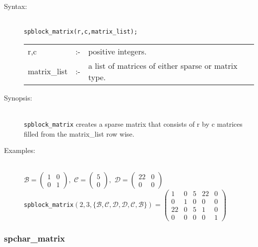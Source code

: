 \begin{description}

\item[Syntax:]\mbox{}\\
\texttt{spblock\_matrix(r,c,matrix\_list);}\\[2mm]
\begin{tabular}{l l l}
r,c          &:-& positive integers. \\
matrix\_list &:-& a list of matrices of either sparse or matrix type.
\end{tabular}

\item[Synopsis:]\mbox{}\\
\texttt{spblock\_matrix} creates a sparse matrix that consists of r by c matrices
filled from the matrix\_list row wise.

\item[Examples:]\mbox{}\\
\(\mathcal{B} = \begin{pmatrix} 1 & 0 \\ 0 & 1 \end{pmatrix}, \,\,
 \mathcal{C} = \begin{pmatrix} 5 \\ 0 \end{pmatrix}, \,\,
 \mathcal{D} = \begin{pmatrix} 22 & 0 \\ 0 & 0 \end{pmatrix}\) \\[2mm]
\texttt{spblock\_matrix}\((2,3,\{\mathcal{B,C,D,D,C,B}\})  =
\begin{pmatrix} 1 & 0 & 5 & 22 & 0 \\ 0 & 1 & 0 & 0 & 0 \\
22 & 0 & 5 & 1 & 0 \\ 0 & 0 & 0 & 0 & 1
\end{pmatrix}\)
\end{description}

\subsubsection{spchar\_matrix}
\label{sparse:spchar_matrix}
\hypertarget{operator:SPCHAR_MATRIX}{}


